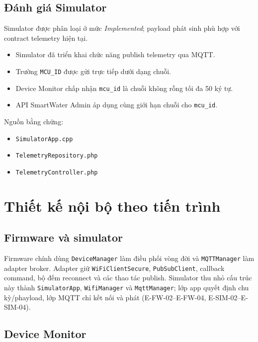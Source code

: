 \subsection{Đánh giá Simulator}

Simulator được phân loại ở mức \textit{Implemented}; payload phát sinh phù hợp với
contract telemetry hiện tại.

\begin{itemize}
    \item Simulator đã triển khai chức năng publish telemetry qua MQTT.
    \item Trường \texttt{MCU\_ID} được gửi trực tiếp dưới dạng chuỗi.
    \item Device Monitor chấp nhận \texttt{mcu\_id} là chuỗi không rỗng tối đa 50 ký tự.
    \item API SmartWater Admin áp dụng cùng giới hạn chuỗi cho \texttt{mcu\_id}.
\end{itemize}

Nguồn bằng chứng:

\begin{itemize}
    \item \texttt{SimulatorApp.cpp}
    \item \texttt{TelemetryRepository.php}
    \item \texttt{TelemetryController.php}
\end{itemize}
\section{Thiết kế nội bộ theo tiến trình}

\subsection{Firmware và simulator}

Firmware chính dùng \texttt{DeviceManager} làm điều phối vòng đời và
\texttt{MQTTManager} làm adapter broker. Adapter giữ \texttt{WiFiClientSecure},
\texttt{PubSubClient}, callback command, bộ đếm reconnect và các thao tác publish.
Simulator thu nhỏ cấu trúc này thành \texttt{SimulatorApp}, \texttt{WifiManager} và
\texttt{MqttManager}; lớp app quyết định chu kỳ/phayload, lớp MQTT chỉ kết nối và phát
(E-FW-02--E-FW-04, E-SIM-02--E-SIM-04).

\subsection{Device Monitor}

